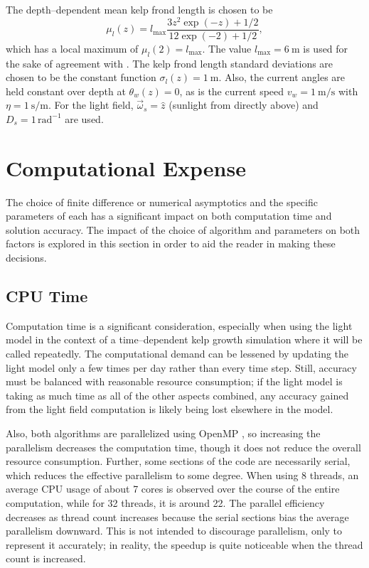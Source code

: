The depth--dependent mean kelp frond length is chosen to be
\begin{equation}
    \mu_l(z) = l_{\max}\frac{3z^2 \exp(-z) + 1/2}{12\exp(-2) + 1/2},
\end{equation}
which has a local maximum of $\mu_l(2)=l_{\max}$.
The value $l_{\max}=\SI{6}{\m}$ is used for the sake of agreement with \cite{norvik_design_2017}.
The kelp frond length standard deviations are chosen to be the constant function $\sigma_l(z) = \SI{1}{\m}$.
Also, the current angles are held constant over depth at $\theta_w(z)=0$, as is the current speed $v_w=\SI{1}{\m\per\s}$ with $\eta=\SI{1}{\s\per\m}$.
For the light field, $\vec{\omega}_s=\hat{z}$ (sunlight from directly above) and $D_s=1\, \mbox{rad}^{-1}$ are used.

\section{Computational Expense}
The choice of finite difference or numerical asymptotics and the specific parameters of each has a significant impact on both computation time and solution accuracy.
The impact of the choice of algorithm and parameters on both factors is explored in this section in order to aid the reader in making these decisions.

\subsection{CPU Time}
Computation time is a significant consideration, especially when using the light model in the context of a time--dependent kelp growth simulation where it will be called repeatedly.
The computational demand can be lessened by updating the light model only a few times per day rather than every time step.
Still, accuracy must be balanced with reasonable resource consumption; if the light model is taking as much time as all of the other aspects combined, any accuracy gained from the light field computation is likely being lost elsewhere in the model.

Also, both algorithms are parallelized using OpenMP \cite{message_passing_interface_forum_mpi:_1993}, so increasing the parallelism decreases the computation time, though it does not reduce the overall resource consumption.
Further, some sections of the code are necessarily serial, which reduces the effective parallelism to some degree.
When using 8 threads, an average CPU usage of about 7 cores is observed over the course of the entire computation, while for 32 threads, it is around 22. 
The parallel efficiency decreases as thread count increases because the serial sections bias the average parallelism downward.
This is not intended to discourage parallelism, only to represent it accurately; in reality, the speedup is quite noticeable when the thread count is increased.

